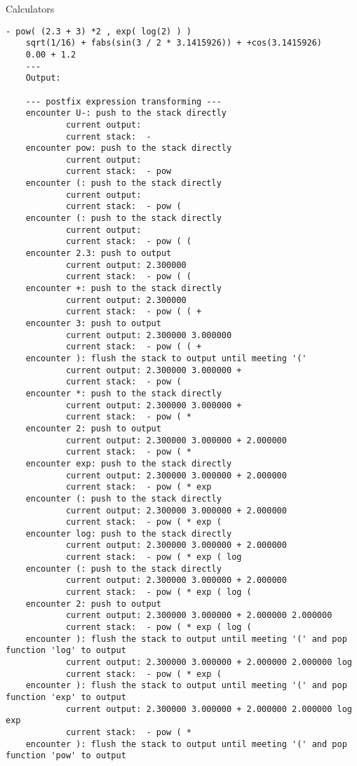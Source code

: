 \begin{homeworkProblem}{Calculators}
\begin{lstlisting}[breaklines=true]
    - pow( (2.3 + 3) *2 , exp( log(2) ) )
    sqrt(1/16) + fabs(sin(3 / 2 * 3.1415926)) + +cos(3.1415926)
    0.00 + 1.2
    ---
    Output:

    --- postfix expression transforming ---
    encounter U-: push to the stack directly
            current output:
            current stack:  -
    encounter pow: push to the stack directly
            current output:
            current stack:  - pow
    encounter (: push to the stack directly
            current output:
            current stack:  - pow (
    encounter (: push to the stack directly
            current output:
            current stack:  - pow ( (
    encounter 2.3: push to output
            current output: 2.300000
            current stack:  - pow ( (
    encounter +: push to the stack directly
            current output: 2.300000
            current stack:  - pow ( ( +
    encounter 3: push to output
            current output: 2.300000 3.000000
            current stack:  - pow ( ( +
    encounter ): flush the stack to output until meeting '(' 
            current output: 2.300000 3.000000 +
            current stack:  - pow (
    encounter *: push to the stack directly
            current output: 2.300000 3.000000 +
            current stack:  - pow ( *
    encounter 2: push to output
            current output: 2.300000 3.000000 + 2.000000
            current stack:  - pow ( *
    encounter exp: push to the stack directly
            current output: 2.300000 3.000000 + 2.000000
            current stack:  - pow ( * exp
    encounter (: push to the stack directly
            current output: 2.300000 3.000000 + 2.000000
            current stack:  - pow ( * exp (
    encounter log: push to the stack directly
            current output: 2.300000 3.000000 + 2.000000
            current stack:  - pow ( * exp ( log
    encounter (: push to the stack directly
            current output: 2.300000 3.000000 + 2.000000
            current stack:  - pow ( * exp ( log (
    encounter 2: push to output
            current output: 2.300000 3.000000 + 2.000000 2.000000
            current stack:  - pow ( * exp ( log (
    encounter ): flush the stack to output until meeting '(' and pop function 'log' to output
            current output: 2.300000 3.000000 + 2.000000 2.000000 log
            current stack:  - pow ( * exp (
    encounter ): flush the stack to output until meeting '(' and pop function 'exp' to output
            current output: 2.300000 3.000000 + 2.000000 2.000000 log exp
            current stack:  - pow ( *
    encounter ): flush the stack to output until meeting '(' and pop function 'pow' to output

\end{lstlisting}
\end{homeworkProblem}
